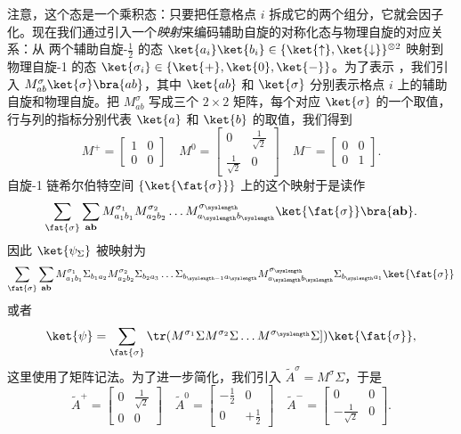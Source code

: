 注意，这个态是一个乘积态：只要把任意格点 $i$ 拆成它的两个组分，它就会因子化。现在我们通过引入一个{\em 映射}来编码辅助自旋的对称化态与物理自旋的对应关系：从
两个辅助自旋-$\frac{1}{2}$ 的态 $\ket{a_i}\ket{b_i} \in \{
\ket{\uparrow},\ket{\downarrow}\}^{\otimes 2}$ 映射到
物理自旋-1 的态 $\ket{\sigma_i} \in \{ \ket{+},\ket{0},\ket{-} \}$。为了表示 ，我们引入 $M_{ab}^{\sigma}
\ket{\sigma} \bra{ab}$，其中 $\ket{ab}$ 和 $\ket{\sigma}$ 分别表示格点 $i$ 上的辅助自旋和物理自旋。把 $M_{ab}^{\sigma}$ 写成三个 $2\times 2$ 矩阵，每个对应 $\ket{\sigma}$ 的一个取值，行与列的指标分别代表 $\ket{a}$ 和 $\ket{b}$ 的取值，我们得到
\begin{equation}
    M^+ = \left[ \begin{array}{cc} 1 & 0 \\ 0 & 0 \end{array} \right] \quad
    M^0 = \left[ \begin{array}{cc} 0 & \frac{1}{\sqrt{2}} \\ 
    \frac{1}{\sqrt{2}} & 0 \end{array} \right] \quad
    M^- = \left[ \begin{array}{cc} 0 & 0 \\ 0 & 1 \end{array} \right] .
\end{equation}
自旋-1 链希尔伯特空间 $\{ \ket{\fat{\sigma}} \}$ 上的这个映射于是读作
\begin{equation} 
\sum_{\fat{\sigma}} \sum_{{\bf a}{\bf b}} M^{\sigma_1}_{a_1 b_1} M^{\sigma_2}_{a_2 b_2} \ldots M^{\sigma_\syslength}_{a_\syslength b_\syslength}
\ket{\fat{\sigma}} \bra{{\bf a}{\bf b}} .
\end{equation}
因此 $\ket{\psi_\Sigma}$ 被映射为
\begin{equation}
\sum_{\fat{\sigma}} \sum_{{\bf a}{\bf b}} M^{\sigma_1}_{a_1 b_1} \Sigma_{b_1 a_2}
M^{\sigma_2}_{a_2 b_2} \Sigma_{b_2 a_3} \ldots \Sigma_{b_{\syslength-1} a_\syslength} 
M^{\sigma_\syslength}_{a_\syslength b_\syslength} \Sigma_{b_\syslength a_1} 
\ket{\fat{\sigma}}
\end{equation}
或者
\begin{equation}
    \ket{\psi} = \sum_{\fat{\sigma}} \tr (M^{\sigma_{1}} \Sigma
    M^{\sigma_{2}} \Sigma \ldots M^{\sigma_{\syslength}} \Sigma] ) \ket{\fat{\sigma}} ,
\end{equation}
这里使用了矩阵记法。为了进一步简化，我们引入 $\tilde{A}^\sigma= M^\sigma \Sigma$，于是
\begin{equation}
    \tilde{A}^+ = \left[ \begin{array}{cc} 0 & \frac{1}{\sqrt{2}} \\ 0 & 0 \end{array} \right] \quad
    \tilde{A}^0 = \left[ \begin{array}{cc} -\frac{1}{2} & 0 \\ 
    0 & +\frac{1}{2} \end{array} \right] \quad
    \tilde{A}^- = \left[ \begin{array}{cc} 0 & 0 \\ -\frac{1}{\sqrt{2}} & 0 \end{array} \right] .
    \label{eq:unnormalizeda}
\end{equation}
